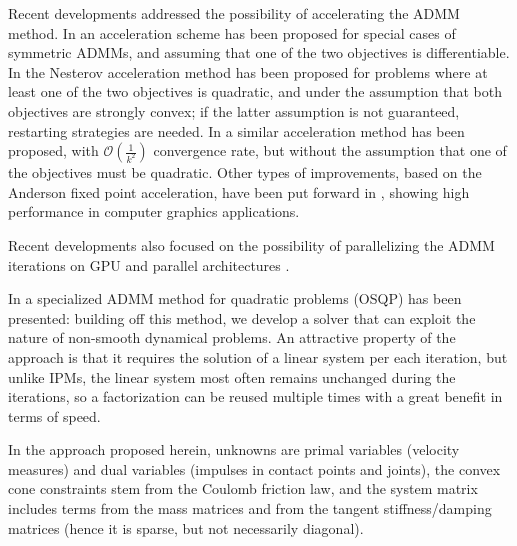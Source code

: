 \documentclass[AMA,STIX1COL]{WileyNJD-v2}
\begin{document}
Recent developments addressed the possibility of accelerating the ADMM method.
In 
 \cite{Goldfarb2013} %
an acceleration scheme has been proposed for special cases of symmetric ADMMs, and assuming that one of the two objectives is differentiable.
%
In 
 \cite{Goldstein2014} %
the Nesterov acceleration method has been proposed for problems where at least one of the two objectives is quadratic, and under the assumption that both objectives are strongly convex; if the latter assumption is not guaranteed, restarting strategies are needed. 
%
In 
 \cite{Kadkhodaie2015} %
a similar acceleration method has been proposed, with $\mathcal{O}\left(\frac{1}{k^2}\right)$ convergence rate, but without the assumption that one of the objectives must be quadratic.
%
Other types of improvements, based on the Anderson fixed point acceleration, have been put forward in 
 \cite{Zhang2019} %
 \cite{Ouyang2020} %
, showing high performance in computer graphics applications.

Recent developments also focused on the possibility of parallelizing the ADMM iterations on GPU and parallel architectures
\cite{Schubiger2020}. %

In
\cite{Stellato2020} %
a specialized ADMM method for quadratic problems (OSQP) has been presented: building off this method, we develop a solver that can exploit the nature of non-smooth dynamical problems. An attractive property of the approach is that it requires the solution of a linear system per each iteration, but unlike IPMs, the linear system most often remains unchanged during the iterations, so a factorization can be reused multiple times with a great benefit in terms of speed.

In the approach proposed herein, unknowns are primal variables (velocity measures) and dual variables (impulses in contact points and joints), the convex cone constraints stem from the Coulomb friction law, and the system matrix includes terms from the mass matrices and from the tangent stiffness/damping matrices (hence it is sparse, but not necessarily diagonal).
\end{document}

